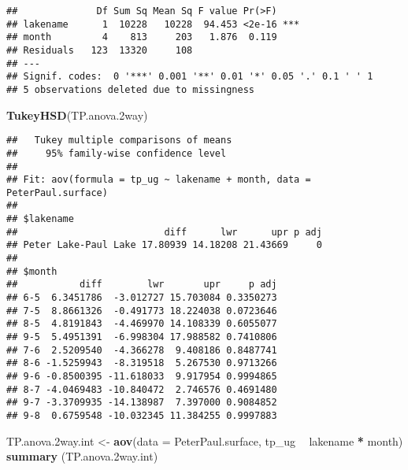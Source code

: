 \documentclass[]{article}
\newenvironment{Shaded}{\begin{snugshade}}{\end{snugshade}}
\newcommand{\CommentTok}[1]{\textcolor[rgb]{0.56,0.35,0.01}{\textit{#1}}}
\newcommand{\DataTypeTok}[1]{\textcolor[rgb]{0.13,0.29,0.53}{#1}}
\newcommand{\FloatTok}[1]{\textcolor[rgb]{0.00,0.00,0.81}{#1}}
\newcommand{\KeywordTok}[1]{\textcolor[rgb]{0.13,0.29,0.53}{\textbf{#1}}}
\newcommand{\NormalTok}[1]{#1}
\newcommand{\OperatorTok}[1]{\textcolor[rgb]{0.81,0.36,0.00}{\textbf{#1}}}
\newcommand{\StringTok}[1]{\textcolor[rgb]{0.31,0.60,0.02}{#1}}
\begin{document}
\begin{Shaded}
\end{Shaded}

\begin{verbatim}
##              Df Sum Sq Mean Sq F value Pr(>F)    
## lakename      1  10228   10228  94.453 <2e-16 ***
## month         4    813     203   1.876  0.119    
## Residuals   123  13320     108                   
## ---
## Signif. codes:  0 '***' 0.001 '**' 0.01 '*' 0.05 '.' 0.1 ' ' 1
## 5 observations deleted due to missingness
\end{verbatim}

\begin{Shaded}
\begin{Highlighting}[]
\KeywordTok{TukeyHSD}\NormalTok{(TP.anova}\FloatTok{.2}\NormalTok{way)}
\end{Highlighting}
\end{Shaded}

\begin{verbatim}
##   Tukey multiple comparisons of means
##     95% family-wise confidence level
## 
## Fit: aov(formula = tp_ug ~ lakename + month, data = PeterPaul.surface)
## 
## $lakename
##                          diff      lwr      upr p adj
## Peter Lake-Paul Lake 17.80939 14.18208 21.43669     0
## 
## $month
##           diff        lwr       upr     p adj
## 6-5  6.3451786  -3.012727 15.703084 0.3350273
## 7-5  8.8661326  -0.491773 18.224038 0.0723646
## 8-5  4.8191843  -4.469970 14.108339 0.6055077
## 9-5  5.4951391  -6.998304 17.988582 0.7410806
## 7-6  2.5209540  -4.366278  9.408186 0.8487741
## 8-6 -1.5259943  -8.319518  5.267530 0.9713266
## 9-6 -0.8500395 -11.618033  9.917954 0.9994865
## 8-7 -4.0469483 -10.840472  2.746576 0.4691480
## 9-7 -3.3709935 -14.138987  7.397000 0.9084852
## 9-8  0.6759548 -10.032345 11.384255 0.9997883
\end{verbatim}

\begin{Shaded}
\begin{Highlighting}[]
\NormalTok{TP.anova}\FloatTok{.2}\NormalTok{way.int <-}\StringTok{ }\KeywordTok{aov}\NormalTok{(}\DataTypeTok{data =}\NormalTok{ PeterPaul.surface, tp_ug }\OperatorTok{~}\StringTok{ }\NormalTok{lakename }\OperatorTok{*}\StringTok{ }\NormalTok{month)}
\KeywordTok{summary}\NormalTok{ (TP.anova}\FloatTok{.2}\NormalTok{way.int)}
\end{Highlighting}
\end{Shaded}
\end{document}
